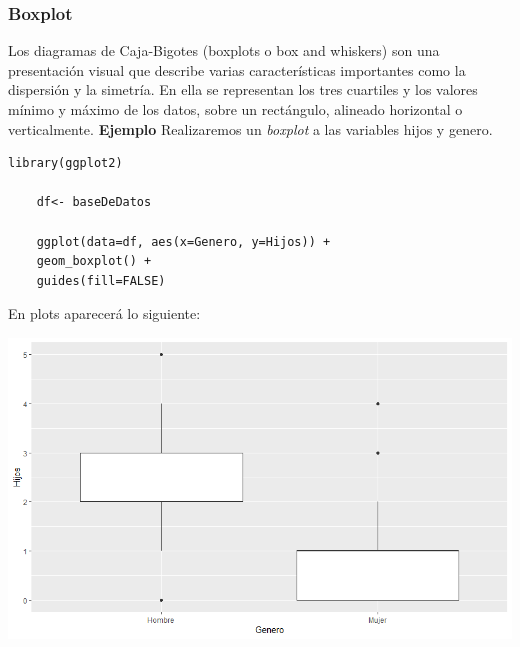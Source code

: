 \documentclass[12pt,hidelinks]{article}
\begin{document}
	\subsubsection{Boxplot}
	Los diagramas de Caja-Bigotes (boxplots o box and whiskers) son una presentación visual que describe varias características importantes como la dispersión y la simetría. En ella se representan los tres cuartiles y los valores mínimo y máximo de los datos, sobre un rectángulo, alineado horizontal o verticalmente. \textbf{Ejemplo} Realizaremos un  \textit{boxplot} a las variables hijos y genero.
	\begin{lstlisting}[frame=single]
	library(ggplot2)
	
	df<- baseDeDatos
	
	ggplot(data=df, aes(x=Genero, y=Hijos)) + 
	geom_boxplot() +
	guides(fill=FALSE)
	\end{lstlisting}
	En plots aparecerá lo siguiente:
	\begin{center}
		\includegraphics[width = 14cm]{GaficaBox.png}
	\end{center}
\end{document}
